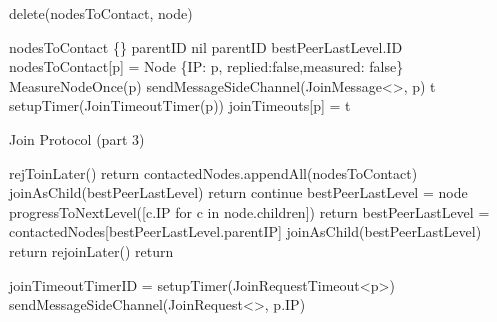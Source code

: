 \begin{algorithm}
\begin{algorithmic}[1]
    \State delete(nodesToContact, node)
\asdend

    \State nodesToContact \asdassign \{\}
    \State parentID \asdassign  nil
        \State parentID \asdassign  bestPeerLastLevel.ID
    \EndIf
        \State nodesToContact[p] = Node \{IP: p, replied:false,measured: false\}
        \State MeasureNodeOnce(p) 
        \State sendMessageSideChannel(JoinMessage<>, p)
        \State t \asdassign setupTimer(JoinTimeoutTimer(p))
        \State joinTimeouts[p] = t
    \EndFor
\asdend

\end{algorithmic}
\end{algorithm}

\begin{algorithm}
\begin{algorithmic}[1]
\caption{Join Protocol (part 3)}
    
             
                \State rejToinLater()
                \State return
            \EndIf
        \EndIf
        \State contactedNodes.appendAll(nodesToContact)
                    \State joinAsChild(bestPeerLastLevel)
                    \State return
                \EndIf
            \EndIf
                \State continue 
            \EndIf
            \State bestPeerLastLevel = node
            \State progressToNextLevel([c.IP for c in node.children])
            \State return
                \State bestPeerLastLevel = contactedNodes[bestPeerLastLevel.parentIP]
                \State joinAsChild(bestPeerLastLevel)       
                \State return
            \Else
                \State rejoinLater()
                \State return
            \EndIf
        \EndFor
    \asdend
   
    \asdprocedure[joinAsChild(p)]
        \State joinTimeoutTimerID = setupTimer(JoinRequestTimeout<p>)
        \State sendMessageSideChannel(JoinRequest<>, p.IP)
    \asdend


\end{algorithmic}
\end{algorithm}

